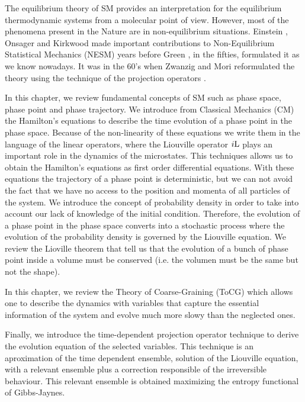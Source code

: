 \documentclass[b5paper,openright,11pt]{book}
\begin{document}
The equilibrium theory of SM provides an interpretation for the equilibrium thermodynamic systems from a molecular point of view.
However, most of the phenomena present in the Nature are in non-equilibrium situations. 
Einstein \cite{Einstein1905}, Onsager \cite{Onsager1931} and Kirkwood \cite{Kirkwood1946} made important contributions to Non-Equilibrium Statistical Mechanics (NESM) years before Green \cite{Green1952, Green1954}, in the fifties, formulated it as we know nowadays. 
It was in the 60's when Zwanzig \cite{Zwanzig1961} and Mori \cite{Mori1965} reformulated the theory using the technique of the projection operators \cite{Grabert1982}. 


In this chapter, we review fundamental concepts of SM such as phase space, phase point and phase trajectory.
We introduce from Classical Mechanics (CM) the Hamilton's equations to describe the time evolution of a phase point in the phase space. 
Because of the non-linearity of these equations we write them in the language of the linear operators, where the Liouville operator $i{\rm L}$ plays an important role in the dynamics of the microstates. 
This techniques allows us to obtain the Hamilton's equations as first order differential equations. 
With these equations the trajectory of a phase point is deterministic, but we can not avoid the fact that we have no access to the position and momenta of all particles of the system. 
We introduce the concept of probability density in order to take into account our lack of knowledge of the initial condition. 
Therefore, the evolution of a phase point in the phase space converts into a stochastic process where the evolution of the probability density  is governed by the Liouville equation.
We review the Lioville theorem that tell us that the evolution of a bunch of phase point inside a volume must be conserved (i.e. the volumen must be the same but not the shape). 

In this chapter, we review the Theory of Coarse-Graining (ToCG) which allows one to describe the dynamics with variables that capture the essential information of the system and evolve much more slowy than the neglected ones. 

Finally, we introduce the time-dependent projection operator technique to derive the evolution equation of the selected variables. This technique is an aproximation of the time dependent ensemble, solution of the Liouville equation, with a relevant ensemble plus a correction responsible of the irreversible behaviour. This relevant ensemble is obtained maximizing the entropy functional of Gibbs-Jaynes. 
\end{document}
